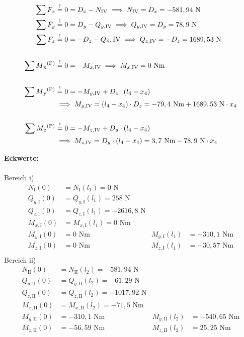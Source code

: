 \begin{enumerate}
\begin{center}
\end{center}
\begin{align*}
	\sum F_x &\overset{!}{=} 0 = D_x - N_{\mathrm{IV}} 
		\implies  N_{\mathrm{IV}} = D_x = -581,94 \text { N}\\ 
	\sum F_y &\overset{!}{=} 0 =D_y - Q_{y,\mathrm{IV}}
		\implies Q_{y,\mathrm{IV}} = D_y = 78,9 \text{ N}\\ 
	\sum F_z &\overset{!}{=} 0 = -D_z -Q{z,\mathrm{IV}} 
		\implies Q_{z,\mathrm{IV}} = -D_z = 1689,53 \text{ N} \\ \\
	\sum M\textsubscript{x}\textsuperscript{(P)} &\overset{!}{=} 0 =- M_{x,\mathrm{IV}}  
		\implies M_{x,\mathrm{IV}} = 0 \text{ Nm} \\ \\
	\sum M\textsubscript{y}\textsuperscript{(P)} &\overset{!}{=} 0 =- M_{y,\mathrm{IV}} + D_z \cdot  (l_4 - x_4) \\
		&\implies M_{y,\mathrm{IV}} =  (l_4 - x_4) \cdot D_z =-79,4\text{ Nm} +1689,53 \text{ N} \cdot x_4\\ \\
	\sum M\textsubscript{z}\textsuperscript{(P)} &\overset{!}{=} 0 = - M_{z,\mathrm{IV}} + D_y \cdot  (l_4 - x_4)  \\
		&\implies  M_{z,\mathrm{IV}} =  D_y \cdot (l_4 - x_4) = 3,7\text{ Nm} -78,9 \text{ N} \cdot x_4
	\end{align*}
\end{enumerate}
\newpage
\textbf{Eckwerte:}\\ \\
Bereich i)
\begin{align*}
	N_{\mathrm{I}} (0) &= N_{\mathrm{I}} (l_1) = 0 \text{ N}\\
	Q_{y,\mathrm{I}} (0) &= Q_{y,\mathrm{I}} (l_1) = 258\text{ N}\\
	Q_{z,\mathrm{I}} (0) &= Q_{z,\mathrm{I}} (l_1) = -2616,8\text{ N}\\
	M_{x,\mathrm{I}} (0) &=  M_{x,\mathrm{I}} (l_1) = 0\text{ Nm}\\
	M_{y,\mathrm{I}} (0) &=  0\text{ Nm} & M_{y,\mathrm{I}} (l_1) &= -310,1\text{ Nm}\\
	M_{z,\mathrm{I}} (0) &= 0\text{ Nm} & M_{z,\mathrm{I}} (l_1) &= -30,57\text{ Nm}\\
\end{align*}
Bereich ii)
\begin{align*}
	N_{\mathrm{II}} (0) &= N_{\mathrm{II}} (l_2) = -581,94 \text{ N}\\
	Q_{y,\mathrm{II}} (0) &= Q_{y,\mathrm{II}} (l_2) =-61,29\text{ N}\\
	Q_{z,\mathrm{II}} (0) &= Q_{z,\mathrm{II}} (l_2) = -1017,92\text{ N}\\
	M_{x,\mathrm{II}} (0) &= M_{x,\mathrm{II}} (l_2) = -71,5\text{ Nm}\\
	M_{y,\mathrm{II}} (0) &=  -310,1 \text{ Nm} & M_{y,\mathrm{II}} (l_2) &= -540,65\text{ Nm}\\
	M_{z,\mathrm{II}} (0) &=  -56,59\text{ Nm} &M_{z,\mathrm{II}} (l_2) &= 25,25\text{ Nm}\\
\end{align*}
